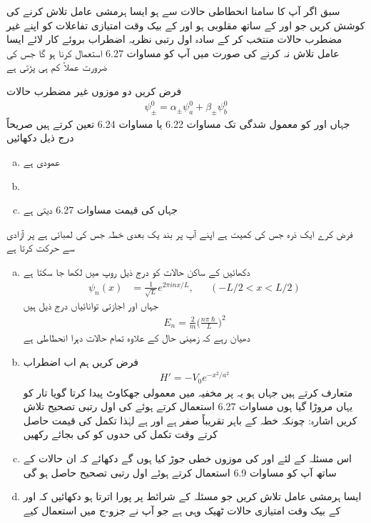 سبق  اگر آپ کا سامنا انحطاطی حالات سے ہو ایسا ہرمشی عامل  تلاش کرنے کی کوشش کریں جو  اور  کے ساتھ  مقلوبی  ہو  اور  کے بیک وقت امتیازی تفاعلات کو اپنے غیر مضطرب حالات منتخب کر کے سادہ اول رتبی نظریہ اضطراب بروئے کار لائے ایسا عامل تلاش نہ کرنے کی صورت میں آپ کو مساوات 6.27 استعمال کرنا ہو گا جس کی ضرورت عملاً  کم ہی پڑتی ہے 


فرض کریں  دو موزوں غیر مضطرب حالات
\begin{align*}
\psi_\pm^0 = \alpha_\pm \psi_a^0 + \beta_\pm \psi_b^0
\end{align*}
جہاں  اور  کو معمول شدگی تک مساوات 6.22 یا مساوات 6.24 تعین کرتے ہیں  صریحاً  درج ذیل دکھائیں 
\begin{enumerate}[a.]
\item
{} عمودی ہے   
\item
{} 
\item
{} جہاں  کی قیمت مساوات 6.27 دیتی ہے 
\end{enumerate}
فرض کرے ایک ذرہ جس کی کمیت  ہے اپنے آپ پر بند یک بعدی خطہ جس کی لمبائی  ہے پر آزادی سے حرکت کرتا ہے 
\begin{enumerate}[a.]
\item
دکھائیں کے ساکن حالات کو درج ذیل روپ میں لکھا جا سکتا ہے 
 \begin{align*}
\psi_n (x) &= \frac{1}{\sqrt{L}} e^{2 \pi i n x/ L}, &&(-L/2 < x < L/2)
\end{align*}
جہاں  اور اجازتی توانائیاں درج ذیل ہیں 
\begin{align*}
E_n = \frac{2}{m} \big ( \frac{n \pi \hslash}{L} \big )^2
\end{align*}
دھیان رہے کہ زمینی حال  کے علاوہ تمام حالات دہرا انحطاطی ہے 
\item
فرض کریں ہم اب اضطراب 
\begin{align*}
H' = -V_0 e^{-x^2 / a^2}
\end{align*}
متعارف کرتے ہیں جہاں  ہو یہ  پر مخفیہ میں معمولی جھکاوٹ پیدا کرتا گویا تار کو یہاں مروڑا گیا ہوں مساوات 6.27 استعمال کرتے ہوئے  کی اول رتبی  تصحیح  تلاش کریں اشارہ: چونکہ  خطہ  کے باہر تقریباً  صفر ہے اور  ہے لہٰذا تکمل کی قیمت حاصل کرتے وقت تکمل کی حدوں کو  کی بجائے   رکھیں 
\item
اس مسئلہ کے لئے  اور  کی موزوں خطی جوڑ کیا ہوں گے دکھائے کہ ان حالات کے ساتھ آپ کو مساوات 6.9 استعمال کرتے ہوئے اول رتبی  تصحیح  حاصل ہو گی 
\item
ایسا ہرمشی عامل  تلاش کریں جو مسئلہ کے شرائط پر پورا اترتا ہو دکھائیں کہ  اور  کے بیک وقت امتیازی حالات ٹھیک وہی ہے  جو آپ نے جزو-ج میں استعمال کیے 
\end{enumerate}

